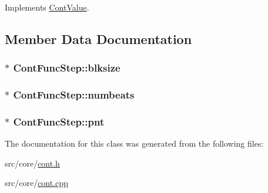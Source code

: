 Implements \hyperlink{a00086_ae3ce98084899bf1a873a1ec6bf15116e}{Cont\-Value}.



\subsection{Member Data Documentation}
\hypertarget{a00058_a5c9588cbcc73f026ad1f393717b23dd7}{
\subsubsection[{blksize}]{ $\ast$ Cont\-Func\-Step\-::blksize\hspace{0.3cm}{\ttfamily [private]}}}\label{a00058_a5c9588cbcc73f026ad1f393717b23dd7}
\hypertarget{a00058_a5695048b68de893beacc7ade45d483a6}{
\subsubsection[{numbeats}]{$\ast$ Cont\-Func\-Step\-::numbeats\hspace{0.3cm}{\ttfamily [private]}}}\label{a00058_a5695048b68de893beacc7ade45d483a6}
\hypertarget{a00058_ad5525f949ad5b9c94ce3d242f44fef54}{
\subsubsection[{pnt}]{$\ast$ Cont\-Func\-Step\-::pnt\hspace{0.3cm}{\ttfamily [private]}}}\label{a00058_ad5525f949ad5b9c94ce3d242f44fef54}


The documentation for this class was generated from the following files\-:\begin{DoxyCompactItemize}
\item 
src/core/\hyperlink{a00218}{cont.\-h}\item 
src/core/\hyperlink{a00217}{cont.\-cpp}\end{DoxyCompactItemize}

